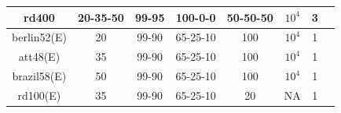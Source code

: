 \begin{frame}
\begin{table}
{\begin{tabular}{|c|c|c|c|c|c|c|c|}
\hline	rd400	&	20-35-50	&	99-95	&	100-0-0	&	50-50-50	&	$10^4$	&	3	\\
\hline	berlin52(E)	&	20	&	99-90	&	65-25-10	&	100	&	$10^4$	&	1	\\
\hline	att48(E)	&	35	&	99-90	&	65-25-10	&	100	&	$10^4$	&	1	\\
\hline	brazil58(E)	&	50	&	99-90	&	65-25-10	&	100	&	$10^4$	&	1	\\
\hline	rd100(E)	&	35	&	99-90	&	65-25-10	&	20	&	NA	&	1	\\
\hline
\end{tabular}}
\end{table}
\end{frame}

